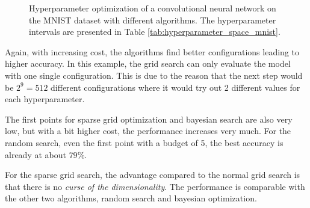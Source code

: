 \begin{figure}[H]
	\centering
	\caption{ Hyperparameter optimization of a convolutional neural network on the MNIST dataset with different algorithms. The hyperparameter intervals are presented in Table \ref{tab:hyperparameter_space_mnist}. }	
	\label{fig:MNIST_results}
\end{figure}

Again, with increasing cost, the algorithms find better configurations leading to higher accuracy. In this example, the grid search can only evaluate the model with one single configuration. This is due to the reason that the next step would be $ 2^9 = 512 $ different configurations where it would try out 2 different values for each hyperparameter. \newline 

The first points for sparse grid optimization and bayesian search are also very low, but with a bit higher cost, the performance increases very much. For the random search, even the first point with a budget of 5, the best accuracy is already at about $ 79\% $. \newline 

For the sparse grid search, the advantage compared to the normal grid search is that there is no \textit{curse of the dimensionality}. The performance is comparable with the other two algorithms, random search and bayesian optimization. \newline 

